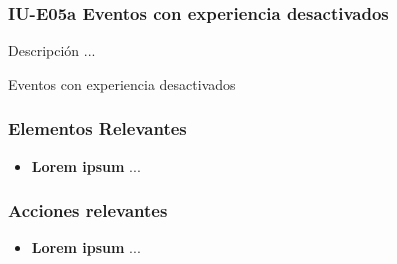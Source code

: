 
\subsubsection{IU-E05a Eventos con experiencia desactivados}

 Descripción ...

    {Eventos con experiencia desactivados}

\subsubsection{Elementos Relevantes}

    \begin{itemize}
    \item {\bf Lorem ipsum}
        ...
    \end{itemize}

\subsubsection{Acciones relevantes}

    \begin{itemize}
    \item {\bf Lorem ipsum}
        ...
    \end{itemize}

\clearpage
